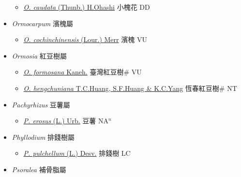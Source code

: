 \begin{itemize}
  \begin{itemize}
        \item[] \href{http://www.theplantlist.org/tpl1.1/search?q=Ohwia+caudata}{\textit{O. caudata} (Thunb.) H.Ohashi}     小槐花 DD
  \end{itemize}
 \item[] \textit{Ormocarpum} 濱槐屬
                    
  \begin{itemize}
        \item[] \href{http://www.theplantlist.org/tpl1.1/search?q=Ormocarpum+cochinchinensis}{\textit{O. cochinchinensis} (Lour.) Merr}   濱槐 VU
  \end{itemize}
 \item[] \textit{Ormosia} 紅豆樹屬
                    
  \begin{itemize}
        \item[] \href{http://www.theplantlist.org/tpl1.1/search?q=Ormosia+formosana}{\textit{O. formosana} Kaneh.}   臺灣紅豆樹\# VU
        \item[] \href{http://www.theplantlist.org/tpl1.1/search?q=Ormosia+hengchuniana}{\textit{O. hengchuniana} T.C.Huang, S.F.Huang \& K.C.Yang}   恆春紅豆樹\# NT
  \end{itemize}
 \item[] \textit{Pachyrhizus} 豆薯屬
                    
  \begin{itemize}
        \item[] \href{http://www.theplantlist.org/tpl1.1/search?q=Pachyrhizus+erosus}{\textit{P. erosus} (L.) Urb.}   豆薯 NA$^n$
  \end{itemize}
 \item[] \textit{Phyllodium} 排錢樹屬
                    
  \begin{itemize}
        \item[] \href{http://www.theplantlist.org/tpl1.1/search?q=Phyllodium+pulchellum}{\textit{P. pulchellum} (L.) Desv.}   排錢樹 LC
  \end{itemize}
 \item[] \textit{Psoralea} 補骨脂屬
                    

\end{itemize}
